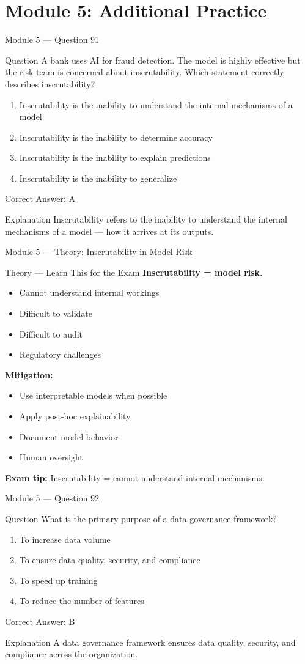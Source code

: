 \documentclass[aspectratio=169,10pt]{beamer}
\newcommand{\question}[1]{%
	\begin{block}{Question}
		#1
	\end{block}
}
\newcommand{\options}[4]{%
	\begin{enumerate}[label=\Alph*.,leftmargin=*]
		\item #1
		\item #2
		\item #3
		\item #4
	\end{enumerate}
}
\newcommand{\answerbox}[1]{%
	\begin{exampleblock}{Correct Answer: #1}
	\end{exampleblock}
}
\newcommand{\explain}[1]{%
	\begin{block}{Explanation}
		\small #1
	\end{block}
}
\newcommand{\theory}[1]{%
	\begin{block}{Theory --- Learn This for the Exam}
		\small #1
	\end{block}
}
\begin{document}
	\section{Module 5: Additional Practice}
	
	\begin{frame}{Module 5 --- Question 91}
		\question{A bank uses AI for fraud detection. The model is highly effective but the risk team is concerned about inscrutability. Which statement correctly describes inscrutability?}
		\options{Inscrutability is the inability to understand the internal mechanisms of a model}{Inscrutability is the inability to determine accuracy}{Inscrutability is the inability to explain predictions}{Inscrutability is the inability to generalize}
		\answerbox{A}
		\explain{Inscrutability refers to the inability to understand the internal mechanisms of a model --- how it arrives at its outputs.}
	\end{frame}
	
	\begin{frame}{Module 5 --- Theory: Inscrutability in Model Risk}
		\theory{
			\textbf{Inscrutability = model risk.}
			\begin{itemize}
				\item Cannot understand internal workings
				\item Difficult to validate
				\item Difficult to audit
				\item Regulatory challenges
			\end{itemize}
			\textbf{Mitigation:}
			\begin{itemize}
				\item Use interpretable models when possible
				\item Apply post-hoc explainability
				\item Document model behavior
				\item Human oversight
			\end{itemize}
			\textbf{Exam tip:} Inscrutability = cannot understand internal mechanisms.
		}
	\end{frame}
	
	\begin{frame}{Module 5 --- Question 92}
		\question{What is the primary purpose of a data governance framework?}
		\options{To increase data volume}{To ensure data quality, security, and compliance}{To speed up training}{To reduce the number of features}
		\answerbox{B}
		\explain{A data governance framework ensures data quality, security, and compliance across the organization.}
	\end{frame}
	
\end{document}
